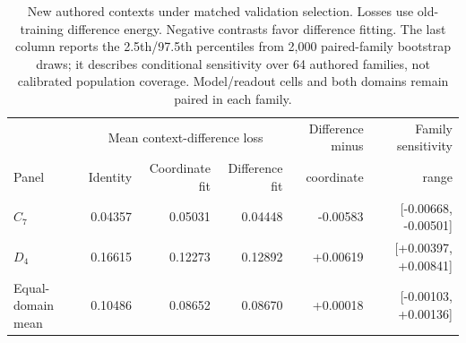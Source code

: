 \begin{table}[t]
\centering\small\setlength{\tabcolsep}{3pt}
\begin{tabular}{@{}lrrrrr@{}}
\toprule
& \multicolumn{3}{c}{Mean context-difference loss} & Difference minus & Family sensitivity \\
Panel & Identity & Coordinate fit & Difference fit & coordinate & range \\
\midrule
$C_7$ & 0.04357 & 0.05031 & 0.04448 & -0.00583 & [-0.00668, -0.00501] \\
$D_4$ & 0.16615 & 0.12273 & 0.12892 & +0.00619 & [+0.00397, +0.00841] \\
Equal-domain mean & 0.10486 & 0.08652 & 0.08670 & +0.00018 & [-0.00103, +0.00136] \\
\bottomrule
\end{tabular}
\caption{New authored contexts under matched validation selection. Losses use old-training difference energy. Negative contrasts favor difference fitting. The last column reports the 2.5th/97.5th percentiles from 2,000 paired-family bootstrap draws; it describes conditional sensitivity over 64 authored families, not calibrated population coverage. Model/readout cells and both domains remain paired in each family.}
\label{tab:followup-context}
\end{table}
